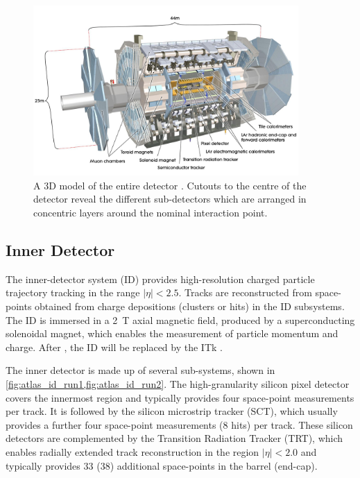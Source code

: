 \begin{figure}[!htpb]
  \centering
  \includegraphics[width=0.9\textwidth]{chapters/2.detector/figs/atlas_detector.jpg}
  \caption{
    A 3D model of the entire \ATLAS detector \cite{Jon-And:1237407}.
    Cutouts to the centre of the detector reveal the different sub-detectors which are arranged in concentric layers around the nominal interaction point.
  }
  \label{fig:atlas_detector}
\end{figure}


\subsection{Inner Detector}\label{sec:atlas_id}

The inner-detector system (ID) provides high-resolution charged particle trajectory tracking in the range $|\eta| < 2.5$.
Tracks are reconstructed from space-points obtained from charge depositions (clusters or hits) in the ID subsystems.
The ID is immersed in a \SI{2}{\tesla} axial magnetic field, produced by a superconducting solenoidal magnet, which enables the measurement of particle momentum and charge.
After \runthree, the ID will be replaced by the ITk \cite{ATLAS-TDR-30,ATLAS-TDR-25}.

The inner detector is made up of several sub-systems, shown in \cref{fig:atlas_id_run1,fig:atlas_id_run2}.
The high-granularity silicon pixel detector covers the innermost region and typically provides four space-point measurements per track.
It is followed by the silicon microstrip tracker (SCT), which usually provides a further four space-point measurements (8 hits) per track.
These silicon detectors are complemented by the Transition Radiation Tracker (TRT),
which enables radially extended track reconstruction in the region $|\eta| < 2.0$ and typically provides 33 (38) additional space-points in the barrel (end-cap). 


